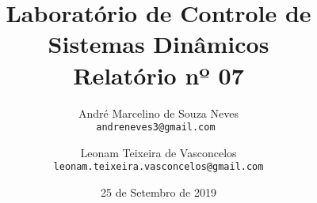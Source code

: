\title{Laboratório de Controle de Sistemas Dinâmicos \\ \large Relatório nº 07}

\author{
    André Marcelino de Souza Neves \\
    {\color{blue}\texttt{andreneves3@gmail.com }} \and
    Leonam Teixeira de Vasconcelos \\ 
    {\color{blue}\texttt{leonam.teixeira.vasconcelos@gmail.com}}
}

\date{25 de Setembro de 2019}

\maketitle
